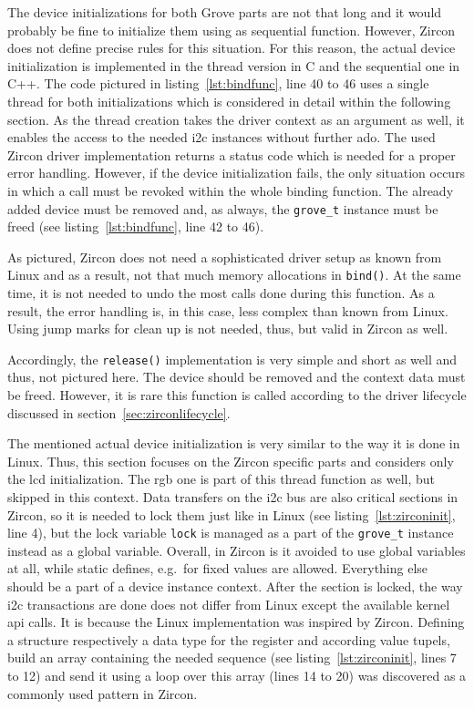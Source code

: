 The device initializations for both Grove parts are not that long and it would probably be fine to initialize them using as sequential function.
However, Zircon does not define precise rules for this situation.
For this reason, the actual device initialization is implemented in the thread version in C and the sequential one in C++.
The code pictured in listing~\ref{lst:bindfunc}, line 40 to 46 uses a single thread for both initializations which is considered in detail within the following section.
As the thread creation takes the driver context as an argument as well, it enables the access to the needed \ac{i2c} instances without further ado.
The used Zircon driver implementation returns a status code which is needed for a proper error handling.
However, if the device initialization fails, the only situation occurs in which a call must be revoked within the whole binding function.
The already added device must be removed and, as always, the \texttt{grove_t} instance must be freed (see listing~\ref{lst:bindfunc}, line 42 to 46).

As pictured, Zircon does not need a sophisticated driver setup as known from Linux and as a result, not that much memory allocations in \texttt{bind()}.
At the same time, it is not needed to undo the most calls done during this function.
As a result, the error handling is, in this case, less complex than known from Linux.
Using jump marks for clean up is not needed, thus, but valid in Zircon as well.

Accordingly, the \texttt{release()} implementation is very simple and short as well and thus, not pictured here.
The device should be removed and the context data must be freed.
However, it is rare this function is called according to the driver lifecycle discussed in section~\ref{sec:zirconlifecycle}.

The mentioned actual device initialization is very similar to the way it is done in Linux.
Thus, this section focuses on the Zircon specific parts and considers only the \ac{lcd} initialization.
The \ac{rgb} one is part of this thread function as well, but skipped in this context.
Data transfers on the \ac{i2c} bus are also critical sections in Zircon, so it is needed to lock them just like in Linux (see listing~\ref{lst:zirconinit}, line 4), but the lock variable \texttt{lock} is managed as a part of the \texttt{grove_t} instance instead as a global variable.
Overall, in Zircon is it avoided to use global variables at all, while static defines, e.g.\ for fixed values are allowed.
Everything else should be a part of a device instance context.
After the section is locked, the way \ac{i2c} transactions are done does not differ from Linux except the available kernel \ac{api} calls.
It is because the Linux implementation was inspired by Zircon.
Defining a structure respectively a data type for the register and according value tupels, build an array containing the needed sequence (see listing~\ref{lst:zirconinit}, lines 7 to 12) and send it using a loop over this array (lines 14 to 20) was discovered as a commonly used pattern in Zircon.

